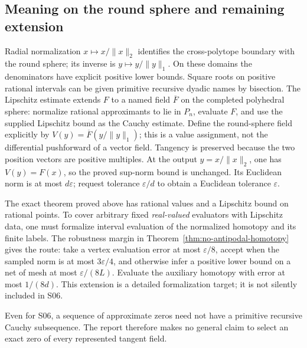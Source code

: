 \subsection{Meaning on the round sphere and remaining extension}

Radial normalization $x\mapsto x/\|x\|_2$ identifies the cross-polytope boundary with the round sphere; its inverse is $y\mapsto y/\|y\|_1$. On these domains the denominators have explicit positive lower bounds. Square roots on positive rational intervals can be given primitive recursive dyadic names by bisection. The Lipschitz estimate extends $F$ to a named field $\overline F$ on the completed polyhedral sphere: normalize rational approximants to lie in $P_n$, evaluate $F$, and use the supplied Lipschitz bound as the Cauchy estimate. Define the round-sphere field explicitly by $V(y)=\overline F(y/\|y\|_1)$; this is a value assignment, not the differential pushforward of a vector field. Tangency is preserved because the two position vectors are positive multiples. At the output $y=x/\|x\|_2$, one has $V(y)=F(x)$, so the proved sup-norm bound is unchanged. Its Euclidean norm is at most $d\varepsilon$; request tolerance $\varepsilon/d$ to obtain a Euclidean tolerance $\varepsilon$.

The exact theorem proved above has rational values and a Lipschitz bound on rational points. To cover arbitrary fixed \emph{real-valued} evaluators with Lipschitz data, one must formalize interval evaluation of the normalized homotopy and its finite labels. The robustness margin in Theorem~\ref{thm:no-antipodal-homotopy} gives the route: take a vertex evaluation error at most $\varepsilon/8$, accept when the sampled norm is at most $3\varepsilon/4$, and otherwise infer a positive lower bound on a net of mesh at most $\varepsilon/(8L)$. Evaluate the auxiliary homotopy with error at most $1/(8d)$. This extension is a detailed formalization target; it is not silently included in S06.

Even for S06, a sequence of approximate zeros need not have a primitive recursive Cauchy subsequence. The report therefore makes no general claim to select an exact zero of every represented tangent field.

